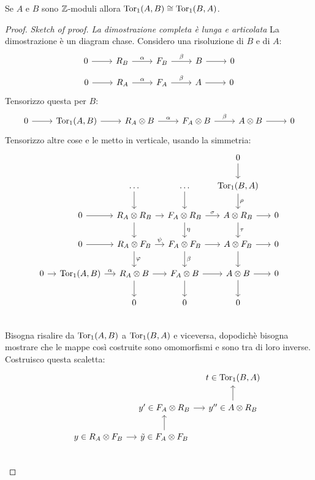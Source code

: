 \begin{proposition}
  Se $ A $ e $ B $ sono $ \mathbb{Z} $-moduli allora $ \mathrm{Tor_1}( A,B) \cong \mathrm{Tor_1}( B,A) $.
\end{proposition}
\begin{proof}\emph{Sketch of proof. La dimostrazione completa è lunga e articolata}
  La dimostrazione è un diagram chase.
  Considero una risoluzione di $ B $ e di $ A $:
  \[
    \begin{tikzcd}
      0 \rar{} & R_B \rar{\alpha} & F_B \rar{\beta} & B \rar & 0
    \end{tikzcd}
  \]
  \[
    \begin{tikzcd}
      0 \rar{} & R_A \rar{\alpha} & F_A \rar{\beta} & A \rar & 0
    \end{tikzcd}
  \]
  Tensorizzo questa per $ B $:
  \[
    \begin{tikzcd}
      0 \rar{} & \tor{A,B} \rar & R_A \otimes B \rar{\alpha} & F_A \otimes B \rar{\beta} & A \otimes B \rar & 0
    \end{tikzcd}
  \]
  Tensorizzo altre cose e le metto in verticale, usando la simmetria:
  \[
    \begin{tikzcd}[nodes={column sep= 10 pt}]
      {} & {} & {} & {} & 0 \dar & {} \\
      {} & {} & \dots \dar & \dots \dar & \tor{B,A} \dar{\rho} & {} \\
      {} & 0 \rar & R_A \otimes R_B \rar \dar & F_A \otimes R_B \dar{\eta} \rar{\sigma} & A \otimes R_B \dar{\tau}  \rar & 0 \\
      {} & 0 \rar & R_A \otimes F_B \rar{\psi} \dar{\phi} & F_A \otimes F_B \dar{\beta} \rar & A \otimes F_B \dar  \rar & 0 \\
      0 \rar & \tor{A,B} \rar{\alpha} & R_A \otimes B \rar \dar & F_A \otimes B \rar \dar & A \otimes B  \rar \dar & 0 \\
      {} & {} & 0 & 0 & 0 & {} \\
    \end{tikzcd}
  \]
  Bisogna risalire da $ \mathrm{Tor_1}( A,B) $ a $ \mathrm{Tor_1}( B,A) $ e viceversa, dopodichè bisogna mostrare
  che le mappe così costruite sono omomorfismi e sono tra di loro inverse.
  Costruisco questa scaletta:
  \[
    \begin{tikzcd}[nodes={column sep= 10 pt}]
      {} & {} & {} & t \in \tor{B,A}   \\
      {} & {} & y' \in F_A \otimes R_B \rar & y'' \in A \otimes R_B  \uar  \\
      {} & y \in R_A \otimes F_B \rar  & \tilde{y} \in F_A \otimes F_B \uar  &  {}  \\

\end{tikzcd}\]
\end{proof}
